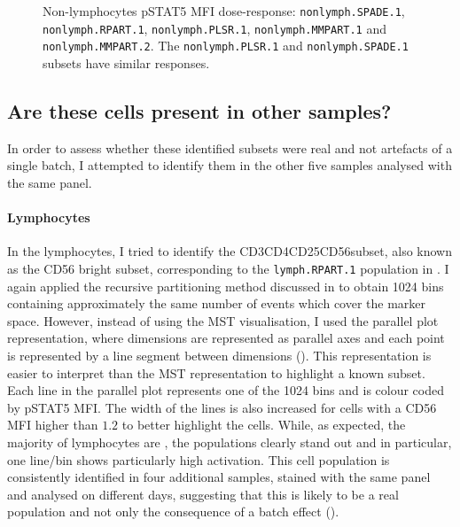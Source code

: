 \begin{figure}
\begin{minipage}{.5\textwidth}
\end{minipage}
\begin{minipage}{.3\textwidth}
{ Non-lymphocytes pSTAT5 MFI dose-response: \texttt{nonlymph.SPADE.1}, \texttt{nonlymph.RPART.1}, \texttt{nonlymph.PLSR.1}, \texttt{nonlymph.MMPART.1} and \texttt{nonlymph.MMPART.2}. }
{
    The \texttt{nonlymph.PLSR.1} and \texttt{nonlymph.SPADE.1} subsets have similar responses.
}
\end{minipage}
\end{figure}



\clearpage

\subsection{Are these cells present in other samples?}

In order to assess whether these identified subsets were real and not artefacts of a single batch, I attempted to identify them in the other five samples analysed with the same panel.

\paragraph{Lymphocytes}

In the lymphocytes, I tried to identify the CD3\negative CD4\negative CD25\negative CD56\positive  subset, also known as the CD56 bright subset, corresponding to the \texttt{lymph.RPART.1} population in .
I again applied the recursive partitioning method discussed in  to obtain 1024 bins containing approximately the same number of events which cover the marker space.
However, instead of using the \gls{MST} visualisation, I used the parallel plot representation, where dimensions are represented as parallel axes and each point is represented by a line segment between dimensions ().
This representation is easier to interpret than the \gls{MST} representation to highlight a known subset.
Each line in the parallel plot represents one of the 1024 bins and is colour coded by pSTAT5 MFI.
The width of the lines is also increased for cells with a CD56 MFI higher than $1.2$ to better highlight the \high cells.
While, as expected, the majority of lymphocytes are \low, the \high populations clearly stand out and in particular, one line/bin shows particularly high activation.
This cell population is consistently identified in four additional samples, stained with the same panel and analysed on different days, suggesting that this is likely to be a real population and not only the consequence of a batch effect ().

